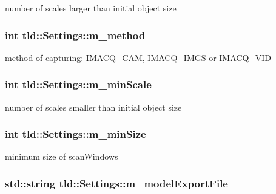 number of scales larger than initial object size 

\hypertarget{classtld_1_1Settings_a2438efb226c38f806bf1b3e023aa3760}{
\subsubsection[{m\-\_\-method}]{\setlength{\rightskip}{0pt plus 5cm}int tld\-::\-Settings\-::m\-\_\-method}}\label{classtld_1_1Settings_a2438efb226c38f806bf1b3e023aa3760}


method of capturing\-: I\-M\-A\-C\-Q\-\_\-\-C\-A\-M, I\-M\-A\-C\-Q\-\_\-\-I\-M\-G\-S or I\-M\-A\-C\-Q\-\_\-\-V\-I\-D 

\hypertarget{classtld_1_1Settings_a46e4d9f59b1f87508cf0ad9a154fdc21}{
\subsubsection[{m\-\_\-min\-Scale}]{\setlength{\rightskip}{0pt plus 5cm}int tld\-::\-Settings\-::m\-\_\-min\-Scale}}\label{classtld_1_1Settings_a46e4d9f59b1f87508cf0ad9a154fdc21}


number of scales smaller than initial object size 

\hypertarget{classtld_1_1Settings_aa08ffe8f36cb983224fadfd3d3b28391}{
\subsubsection[{m\-\_\-min\-Size}]{\setlength{\rightskip}{0pt plus 5cm}int tld\-::\-Settings\-::m\-\_\-min\-Size}}\label{classtld_1_1Settings_aa08ffe8f36cb983224fadfd3d3b28391}


minimum size of scan\-Windows 

\hypertarget{classtld_1_1Settings_a2fb70f5b39e773b64d62f902009827fc}{
\subsubsection[{m\-\_\-model\-Export\-File}]{\setlength{\rightskip}{0pt plus 5cm}std\-::string tld\-::\-Settings\-::m\-\_\-model\-Export\-File}}\label{classtld_1_1Settings_a2fb70f5b39e773b64d62f902009827fc}


